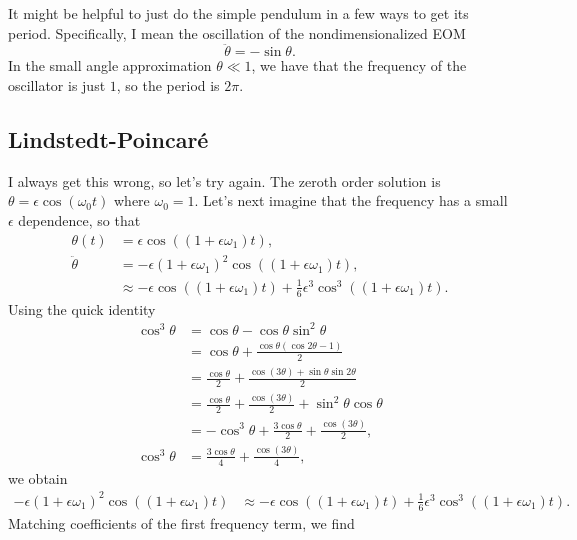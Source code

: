 \documentclass[12pt]{article}
\newcommand*{\p}[1]{\left(#1\right)}
\begin{document}
It might be helpful to just do the simple pendulum in a few ways to get its
period. Specifically, I mean the oscillation of the nondimensionalized EOM
\begin{equation}
    \ddot{\theta} = -\sin\theta.
\end{equation}
In the small angle approximation $\theta \ll 1$, we have that the frequency of
the oscillator is just $1$, so the period is $2\pi$.

\subsection{Lindstedt-Poincar\'e}

I always get this wrong, so let's try again. The zeroth order solution is
$\theta = \epsilon \cos\p{\omega_0 t}$ where $\omega_0 = 1$. Let's next imagine
that the frequency has a small $\epsilon$ dependence, so that
\begin{align*}
    \theta(t) &= \epsilon \cos\p{(1 + \epsilon \omega_1)t},\\
    \ddot{\theta} &= -\epsilon \p{1 + \epsilon \omega_1}^2
            \cos\p{(1 + \epsilon \omega_1)t},\\
            &\approx -\epsilon \cos\p{(1 + \epsilon \omega_1)t}
                + \frac{1}{6}\epsilon^3 \cos^3\p{(1 + \epsilon \omega_1)t}.
\end{align*}
Using the quick identity
\begin{align*}
    \cos^3\theta &= \cos\theta - \cos\theta \sin^2\theta\\
        &= \cos\theta + \frac{\cos\theta\p{\cos 2\theta - 1}}{2}\\
        &= \frac{\cos\theta}{2} + \frac{\cos (3\theta) +
            \sin\theta\sin2\theta}{2}\\
        &= \frac{\cos\theta}{2} + \frac{\cos (3\theta)}{2} +
            \sin^2\theta\cos\theta\\
        &= -\cos^3\theta + \frac{3\cos\theta}{2} + \frac{\cos(3\theta)}{2},\\
    \cos^3\theta &= \frac{3\cos\theta}{4} + \frac{\cos(3\theta)}{4},
\end{align*}
we obtain
\begin{align*}
    -\epsilon \p{1 + \epsilon \omega_1}^2
            \cos\p{(1 + \epsilon \omega_1)t}
            &\approx -\epsilon \cos\p{(1 + \epsilon \omega_1)t}
                + \frac{1}{6}\epsilon^3 \cos^3\p{(1 + \epsilon \omega_1)t}.
\end{align*}
Matching coefficients of the first frequency term, we find
\end{document}
